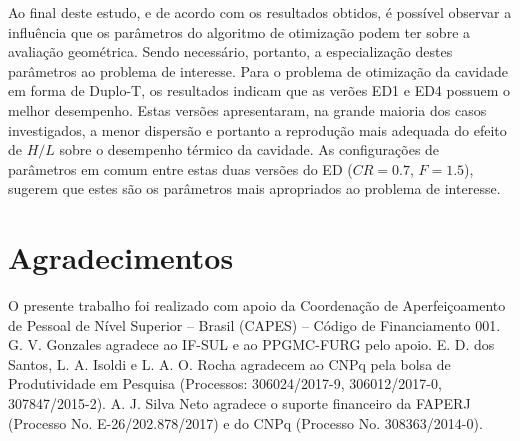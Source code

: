\documentclass[12pt,A4,A4pt]{article}
\begin{document}
Ao final deste estudo, e de acordo com os resultados obtidos, é possível observar a influência que os parâmetros do algoritmo de otimização podem ter sobre a avaliação geométrica. Sendo necessário, portanto, a especialização destes parâmetros ao problema de interesse. Para o problema de otimização da cavidade em forma de Duplo-T, os resultados indicam que as verões ED1 e ED4 possuem o melhor desempenho. Estas versões apresentaram, na grande maioria dos casos investigados, a menor dispersão e portanto a reprodução mais adequada do efeito de $H/L$ sobre o desempenho térmico da cavidade. As configurações de parâmetros em comum entre estas duas versões do ED ($CR=0.7$, $F=1.5$), sugerem que estes são os parâmetros mais apropriados ao problema de interesse.

\section*{Agradecimentos}
\hspace{0.5cm}O presente trabalho foi realizado com apoio da Coordenação de Aperfeiçoamento
de Pessoal de Nível Superior – Brasil (CAPES) – Código de Financiamento 001. G. V. Gonzales agradece ao IF-SUL e ao  PPGMC-FURG pelo apoio.  E. D. dos Santos, L. A. Isoldi e L. A. O. Rocha agradecem ao CNPq pela bolsa de Produtividade em Pesquisa (Processos: 306024/2017-9, 306012/2017-0, 307847/2015-2). A. J. Silva Neto agradece o suporte financeiro da FAPERJ (Processo No. E-26/202.878/2017) e do CNPq (Processo No. 308363/2014-0). 

%


\end{document}

